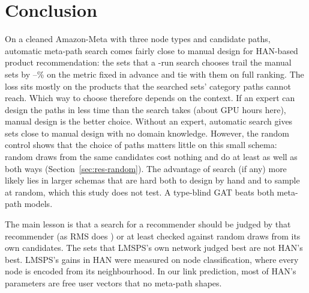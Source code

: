 \section{Conclusion}
\label{sec:conclusion}

On a cleaned Amazon-Meta with three node types and  candidate paths, automatic
meta-path search comes fairly close to manual design for HAN-based product recommendation: the sets
that a -run search chooses trail the manual sets by
--\% on the metric fixed in advance and tie with them on
full ranking. The loss sits mostly on the products that the searched sets' category paths cannot
reach. Which way to choose therefore depends on the context. If an expert can design the paths in
less time than the search takes (about  GPU hours here), manual design is the
better choice. Without an expert, automatic search gives sets close to manual design with no domain
knowledge. However, the random control shows that the choice of paths matters little on this small
schema: random draws from the same candidates cost nothing and do at least as well as both ways
(Section~\ref{sec:res-random}). The advantage of search (if any) more likely lies in larger schemas
that are hard both to design by hand and to sample at random, which this study does not test. A
type-blind GAT beats both meta-path models.

The main lesson is that a search for a recommender should be judged by that recommender (as RMS does
\citep{ning2022automatic}) or at least checked against random draws from its own candidates. The
sets that LMSPS's own network judged best are not HAN's best. LMSPS's gains in HAN
\citep[Table~4]{li2024longrange} were measured on node classification, where every node is encoded
from its neighbourhood. In our link prediction, most of HAN's parameters are free user vectors that
no meta-path shapes.

